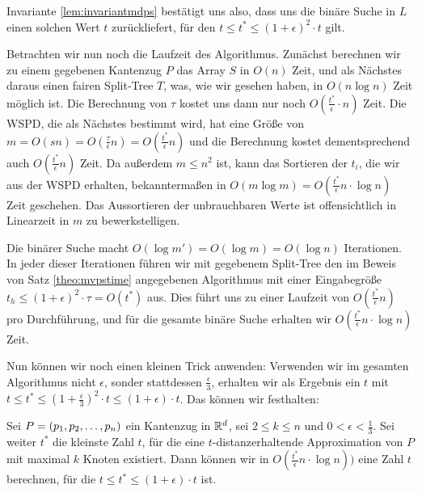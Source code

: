 Invariante \ref{lem:invariantmdps} bestätigt uns also, dass uns die binäre Suche in $L$ einen solchen Wert $t$ zurückliefert, für den $t \leq t^* \leq (1 + \epsilon)^2 \cdot t$ gilt.

Betrachten wir nun noch die Laufzeit des Algorithmus.
Zunächst berechnen wir zu einem gegebenen Kantenzug $P$ das Array $S$ in $O(n)$ Zeit, und als Nächstes daraus einen fairen Split-Tree $T$, was, wie wir gesehen haben, in $O(n \log n)$ Zeit möglich ist. 
Die Berechnung von $\tau$ kostet uns dann nur noch $O(\frac{t^*}{\epsilon} \cdot n)$ Zeit. 
Die WSPD, die als Nächstes bestimmt wird, hat eine Größe von $m = O(sn) = O(\frac{\tau}{\epsilon}n) = O(\frac{t^*}{\epsilon}n)$ und die Berechnung kostet dementsprechend auch $O(\frac{t^*}{\epsilon}n)$ Zeit. 
Da außerdem $m \leq n^2$ ist, kann das Sortieren der $t_i$, die wir aus der WSPD erhalten, bekanntermaßen in $O(m \log m) = O(\frac{t^*}{\epsilon}n \cdot \log n)$ Zeit geschehen. 
Das Aussortieren der unbrauchbaren Werte ist offensichtlich in Linearzeit in $m$ zu bewerkstelligen. 

Die binärer Suche macht $O(\log m') = O(\log m) = O(\log n)$ Iterationen. 
In jeder dieser Iterationen führen wir mit gegebenem Split-Tree den im Beweis von Satz \ref{theo:mvpstime} angegebenen Algorithmus mit einer Eingabegröße $t_h \leq (1 + \epsilon)^2 \cdot \tau = O(t^*)$ aus. 
Dies führt uns zu einer Laufzeit von $O(\frac{t^*}{\epsilon}n)$ pro Durchführung, und für die gesamte binäre Suche erhalten wir $O(\frac{t^*}{\epsilon}n \cdot \log n)$ Zeit.

Nun können wir noch einen kleinen Trick anwenden: Verwenden wir im gesamten Algorithmus nicht $\epsilon$, sonder stattdessen $\frac{\epsilon}{3}$, erhalten wir als Ergebnis ein $t$ mit $t \leq t^* \leq (1 + \frac{\epsilon}{3})^2 \cdot t \leq (1 + \epsilon)\cdot t$. Das können wir festhalten:

\begin{theorem}
	Sei $P = (p_1, p_2, \mathellipsis, p_n)$ ein Kantenzug in $\mathbb{R}^d$, sei $2 \leq k \leq n$ und $0 < \epsilon < \frac{1}{3}$. 
	Sei weiter $t^*$ die kleinste Zahl $t$, für die eine $t$-distanzerhaltende Approximation von $P$ mit maximal $k$ Knoten existiert.
	Dann können wir in $O(\frac{t^*}{\epsilon}n \cdot \log n))$ eine Zahl $t$ berechnen, für die $t \leq t^* \leq (1 + \epsilon)\cdot t$ ist.
\end{theorem}
